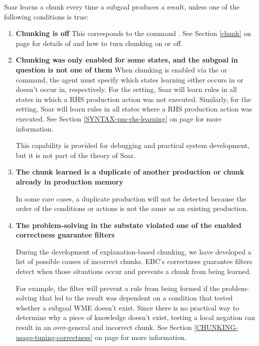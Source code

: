 \begin{itemize}
Soar learns a chunk every time a subgoal produces a result, unless one of the following conditions is true:

\begin{enumerate}
	\item \textbf{Chunking is off} \hfill
	This corresponds to the command .  See Section \ref{chunk} on page \pageref{chunk} for details of  and how to turn chunking on or off.

	\item \textbf{Chunking was only enabled for some states, and the subgoal in question is not one of them} \hfill
	When chunking is enabled via the  or  command, the agent must specify which states learning either occurs in or doesn't occur in, respectively.  For the  setting, Soar will learn rules in all states in which a  RHS production action was not executed.  Similarly, for the  setting, Soar will learn rules in all states where a  RHS production action was executed.  See Section \ref{SYNTAX-pm-rhs-learning} on page \pageref{SYNTAX-pm-rhs-learning} for more information.

	This capability is provided for debugging and practical system development, but it is not part of the theory of Soar.

	\item \textbf{The chunk learned is a duplicate of another production or chunk already in production memory} \hfill

	In some rare cases, a duplicate production will not be detected because the order of the conditions or actions is not the same as an existing production.

	\item \textbf{The problem-solving in the substate violated one of the enabled correctness guarantee filters}

	During the development of explanation-based chunking, we have developed a list of possible causes of incorrect chunks. EBC's correctness guarantee filters detect when those situations occur and prevents a chunk from being learned.  

	For example, the  filter will prevent a rule from being formed if the problem-solving that led to the result was dependent on a condition that tested whether a subgoal WME doesn't exist.  Since there is no practical way to determine why a piece of knowledge doesn't exist, testing a local negation can result in an over-general and incorrect chunk.  See Section \ref{CHUNKING-usage-tuning-correctness} on page \pageref{CHUNKING-usage-tuning-correctness} for more information. 


\end{enumerate}
\end{itemize}
